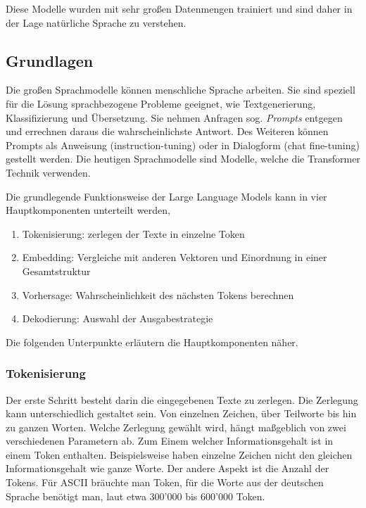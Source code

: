 Diese Modelle wurden mit sehr großen Datenmengen trainiert und sind daher in der Lage natürliche Sprache zu verstehen.

\subsection{Grundlagen}

Die großen Sprachmodelle können menschliche Sprache arbeiten. Sie sind speziell für die Lösung  sprachbezogene Probleme geeignet, wie Textgenerierung, Klassifizierung und Übersetzung. Sie nehmen Anfragen sog. \textit{Prompts} entgegen und errechnen daraus die wahrscheinlichste Antwort. Des Weiteren können Prompts als Anweisung (instruction-tuning) oder in Dialogform (chat fine-tuning) gestellt werden. Die heutigen Sprachmodelle sind Modelle, welche die Transformer Technik verwenden.

Die grundlegende Funktionsweise der Large Language Models kann in vier Hauptkomponenten unterteilt werden,

\begin{enumerate}
	\item Tokenisierung: zerlegen der Texte in einzelne Token
	\item Embedding: Vergleiche mit anderen Vektoren und Einordnung in einer Gesamtstruktur
	\item Vorhersage: Wahrscheinlichkeit des nächsten Tokens berechnen
	\item Dekodierung: Auswahl der Ausgabestrategie
\end{enumerate}

Die folgenden Unterpunkte erläutern die Hauptkomponenten näher.

\subsubsection{Tokenisierung}
Der erste Schritt besteht darin die eingegebenen Texte zu zerlegen. Die Zerlegung kann unterschiedlich gestaltet sein. Von einzelnen Zeichen, über Teilworte bis hin zu ganzen Worten. Welche Zerlegung gewählt wird, hängt maßgeblich von zwei verschiedenen Parametern ab. Zum Einem welcher Informationsgehalt ist in einem Token enthalten. Beispielsweise haben einzelne Zeichen nicht den gleichen Informationsgehalt wie ganze Worte. Der andere Aspekt ist die Anzahl der Tokens. Für ASCII bräuchte man  Token, für die Worte aus der deutschen Sprache benötigt man, laut \cite{duden_unknown-author} etwa 300'000 bis 600'000 Token.\vspace{0.2cm}

